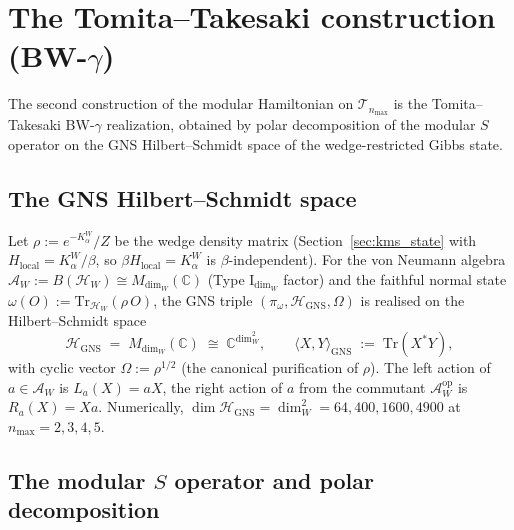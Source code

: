 \documentclass[11pt,a4paper]{article}
\theoremstyle{plain}
\theoremstyle{definition}
\newcommand{\nmax}{n_{\max}}
\newcommand{\Hilb}{\mathcal{H}}
\newcommand{\Tcal}{\mathcal{T}}
\newcommand{\Acal}{\mathcal{A}}
\newcommand{\C}{\mathbb{C}}
\newcommand{\Tr}{\mathrm{Tr}}
\newcommand{\GNS}{\mathrm{GNS}}
\begin{document}
\section{The Tomita--Takesaki construction (BW-$\gamma$)}
\label{sec:tt_construction}

The second construction of the modular Hamiltonian on $\Tcal_{\nmax}$
is the Tomita--Takesaki BW-$\gamma$ realization, obtained by polar
decomposition of the modular $S$ operator on the GNS Hilbert--Schmidt
space of the wedge-restricted Gibbs state.

\subsection{The GNS Hilbert--Schmidt space}\label{sec:gns}

Let $\rho := e^{-K_\alpha^W}/Z$ be the wedge density matrix
(Section~\ref{sec:kms_state} with $H_{\mathrm{local}} = K_\alpha^W /
\beta$, so $\beta H_{\mathrm{local}} = K_\alpha^W$ is
$\beta$-independent). For the von Neumann algebra
$\Acal_W := B(\Hilb_W) \cong M_{\dim_W}(\C)$ (Type I$_{\dim_W}$
factor) and the faithful normal state
$\omega(O) := \Tr_{\Hilb_W}(\rho \, O)$, the GNS triple
$(\pi_\omega, \Hilb_{\GNS}, \Omega)$ is realised on the
Hilbert--Schmidt space
\begin{equation}\label{eq:H_GNS_def}
   \Hilb_{\GNS}
   \;=\; M_{\dim_W}(\C)
   \;\cong\; \C^{\dim_W^2},
   \qquad
   \langle X, Y \rangle_{\GNS} \;:=\; \Tr(X^* Y),
\end{equation}
with cyclic vector $\Omega := \rho^{1/2}$ (the canonical purification
of $\rho$). The left action of $a \in \Acal_W$ is $L_a(X) = a X$, the
right action of $a$ from the commutant $\Acal_W^{\mathrm{op}}$ is
$R_a(X) = X a$. Numerically, $\dim \Hilb_{\GNS} = \dim_W^2 = 64, 400,
1600, 4900$ at $\nmax = 2, 3, 4, 5$.

\subsection{The modular $S$ operator and polar decomposition}
\label{sec:S_polar}
\end{document}

